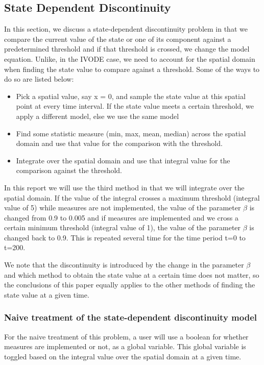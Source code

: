 \documentclass{article}
\begin{document}
\subsection{State Dependent Discontinuity}
\label{subsection:pde_state_intro}
In this section, we discuss a state-dependent discontinuity problem in that we compare the current value of the state or one of its component against a predetermined threshold and if that threshold is crossed, we change the model equation. Unlike, in the IVODE case, we need to account for the spatial domain when finding the state value to compare against a threshold. Some of the ways to do so are listed below:
\begin{itemize}
\item Pick a spatial value, say x = 0, and sample the state value at this spatial point at every time interval. If the state value meets a certain threshold, we apply a different model, else we use the same model

\item Find some statistic measure (min, max, mean, median) across the spatial domain and use that value for the comparison with the threshold.

\item Integrate over the spatial domain and use that integral value for the comparison against the threshold.
\end{itemize}

In this report we will use the third method in that we will integrate over the spatial domain. If the value of the integral crosses a maximum threshold (integral value of 5) while measures are not implemented, the value of the parameter $\beta$ is changed from 0.9 to 0.005 and if measures are implemented and we cross a certain minimum threshold (integral value of 1), the value of the parameter $\beta$ is changed back to 0.9. This is repeated several time for the time period t=0 to t=200.  

We note that the discontinuity is introduced by the change in the parameter $\beta$ and which method to obtain the state value at a certain time does not matter, so the conclusions of this paper equally applies to the other methods of finding the state value at a given time.
 
\subsubsection{Naive treatment of the state-dependent discontinuity model}
\label{subsubsection:pde_state_naive}
For the naive treatment of this problem, a user will use a boolean for whether measures are implemented or not, as a global variable. This global variable is toggled based on the integral value over the spatial domain at a given time.  
\end{document}
